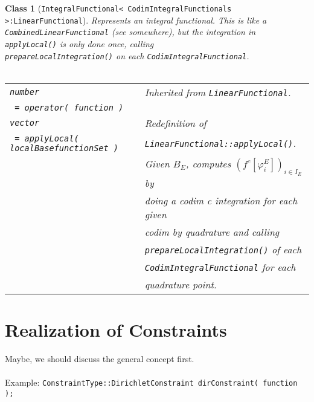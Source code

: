 \documentclass[a4paper,11pt]{article}
\numberwithin{equation}{section}
\newtheorem{class}[definition]{Class}
\newcommand{\theoremEndLine}{\hspace{1mm}}
\newcommand{\CodeT}[1]{\textnormal{\texttt{#1}}}
\begin{document}
    \begin{class}[\CodeT{IntegralFunctional< CodimIntegralFunctionals >:LinearFunctional}]
    Represents an integral functional. This is like a \CodeT{CombinedLinearFunctional} (see somewhere), but the
    integration in \CodeT{applyLocal()} is only done once, calling\\
    \CodeT{prepareLocalIntegration()} on each \CodeT{CodimIntegralFunctional}.\\\\
      \begin{tabular}{|l|l|}
        \hline
        \CodeT{number}
          & Inherited from \CodeT{LinearFunctional}.\\
        \CodeT{ = operator( function )}
          & \\
        \hline
        \CodeT{vector}
          & Redefinition of\\
        \CodeT{ = applyLocal( localBasefunctionSet )}
          & \CodeT{LinearFunctional::applyLocal()}.\\
          & Given ${B_E}$, computes ${(f^c[\varphi_i^E])_{i\in I_E}}$ by\\
          & doing a codim c integration for each given\\
          & codim by quadrature and calling\\
          & \CodeT{prepareLocalIntegration()} of each\\
          & \CodeT{CodimIntegralFunctional} for each\\
          & quadrature point.\\
        \hline
      \end{tabular}
    \end{class}\theoremEndLine


\section{Realization of Constraints}

Maybe, we should discuss the general concept first.\\
\\
Example: {\tt ConstraintType::DirichletConstraint dirConstraint( function );}



  
  
\end{document}
